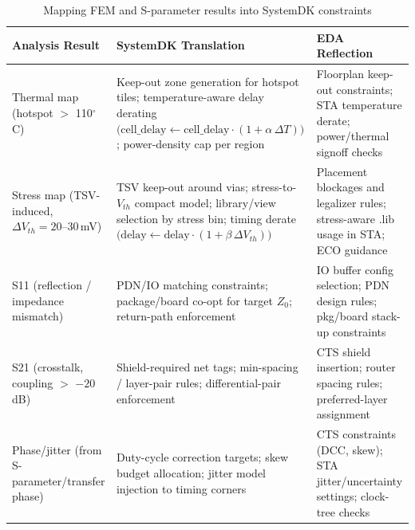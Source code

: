 \documentclass[conference]{IEEEtran}
\begin{document}
\begin{table}[t]
\centering
\caption{Mapping FEM and S-parameter results into SystemDK constraints}
\label{tab:mapping}
\setlength{\tabcolsep}{6pt}          %
\renewcommand{\arraystretch}{1.25}   %
\footnotesize                        %
\begin{tabularx}{\textwidth}{|>{\raggedright\arraybackslash}p{}|
                                >{\raggedright\arraybackslash}p{}|
                                >{\raggedright\arraybackslash}p{}|}
\hline
\textbf{Analysis Result} &
\textbf{SystemDK Translation} &
\textbf{EDA Reflection} \\
\hline
Thermal map (hotspot $>$ 110$^\circ$C) &
Keep-out zone generation for hotspot tiles; temperature-aware delay derating
$\bigl(\text{cell\_delay} \!\gets\! \text{cell\_delay}\cdot(1+\alpha\,\Delta T)\bigr)$; power-density cap per region &
Floorplan keep-out constraints; STA temperature derate; power/thermal signoff checks \\
\hline
Stress map (TSV-induced, $\Delta V_{th}=20$–$30$\,mV) &
TSV keep-out around vias; stress-to-$V_{th}$ compact model; library/view
selection by stress bin; timing derate
$\bigl(\text{delay} \!\gets\! \text{delay}\cdot(1+\beta\,\Delta V_{th})\bigr)$ &
Placement blockages and legalizer rules; stress-aware .lib usage in STA; ECO guidance \\
\hline
S11 (reflection / impedance mismatch) &
PDN/IO matching constraints; package/board co-opt for target $Z_0$; return-path enforcement &
IO buffer config selection; PDN design rules; pkg/board stack-up constraints \\
\hline
S21 (crosstalk, coupling $>$ \(-20\) dB) &
Shield-required net tags; min-spacing / layer-pair rules; differential-pair enforcement &
CTS shield insertion; router spacing rules; preferred-layer assignment \\
\hline
Phase/jitter (from S-parameter/transfer phase) &
Duty-cycle correction targets; skew budget allocation; jitter model injection to timing corners &
CTS constraints (DCC, skew); STA jitter/uncertainty settings; clock-tree checks \\
\hline
\end{tabularx}
\vspace{-2mm}
\end{table}

\end{document}
